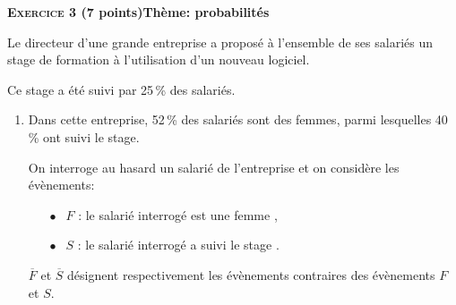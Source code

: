 \documentclass[10pt,a4paper]{article}
\begin{document}
\bigskip

\textbf{\textsc{Exercice 3} \quad (7 points)\hfill Thème: probabilités}

\medskip

Le directeur d'une grande entreprise a proposé à l'ensemble de ses salariés un stage de formation à l'utilisation d'un nouveau logiciel.

Ce stage a été suivi par 25\,\% des salariés.

\medskip

\begin{enumerate}
\item Dans cette entreprise, 52\,\% des salariés sont des femmes, parmi lesquelles 
40\,\% ont suivi le stage.

On interroge au hasard un salarié de l'entreprise et on considère les évènements:

\setlength\parindent{1cm}
\begin{itemize}
\item[$\bullet~~$] $F$ : \og le salarié interrogé est une femme \fg,
\item[$\bullet~~$] $S$ : \og le salarié interrogé a suivi le stage \fg.
\end{itemize}
\setlength\parindent{0cm}

$\overline{F}$ et $\overline{S}$ désignent respectivement les évènements contraires des évènements $F$ et $S$.
\end{enumerate}
\end{document}
